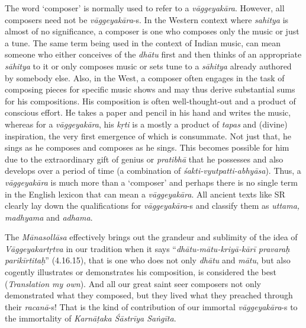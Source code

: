 The word ‘composer’ is normally used to refer to a \textit{vāggeyakāra}. However, all composers need not be \textit{vāggeyakāra}-s. In the Western context where \textit{sahitya} is almost of no significance, a composer is one who composes only the music or just a tune. The same term being used in the context of Indian music, can mean someone who either conceives of the \textit{dhātu} first and then thinks of an appropriate \textit{sāhitya} to it or only composes music or sets tune to a \textit{sāhitya} already authored by somebody else. Also, in the West, a composer often engages in the task of composing pieces for specific music shows and may thus derive substantial sums for his compositions. His composition is often well-thought-out and a product of conscious effort. He takes a paper and pencil in his hand and writes the music, whereas for a \textit{vāggeyakāra}, his \textit{kṛti} is a mostly a product of \textit{tapas} and (divine) inspiration, the very first emergence of which is consummate. Not just that, he sings as he composes and composes as he sings. This becomes possible for him due to the extraordinary gift of genius or \textit{pratibhā} that he possesses and also develops over a period of time (a combination of \textit{śakti-vyutpatti-abhyāsa}). Thus, a \textit{vāggeyakāra} is much more than a ‘composer’ and perhaps there is no single term in the English lexicon that can mean a \textit{vāggeyakāra}. All ancient texts like SR clearly lay down the qualifications for \textit{vāggeyakāra}-s and classify them as \textit{uttama, madhyama} and \textit{adhama}.

The \textit{Mānasollāsa} effectively brings out the grandeur and sublimity of the idea of \textit{Vāggeyakartṛtva} in our tradition when it says “\textit{dhātu-mātu-kriyā-kārī pravaraḥ parikīrtitaḥ}” (4.16.15), that is one who does not only \textit{dhātu} and \textit{mātu}, but also cogently illustrates or demonstrates his composition, is considered the best (\textit{Translation my own}). And all our great saint seer composers not only demonstrated what they composed, but they lived what they preached through their \textit{racanā}-s! That is the kind of contribution of our immortal \textit{vāggeyakāra}-s to the immortality of \textit{Karnāṭaka Śāstrīya Saṅgīta}.

